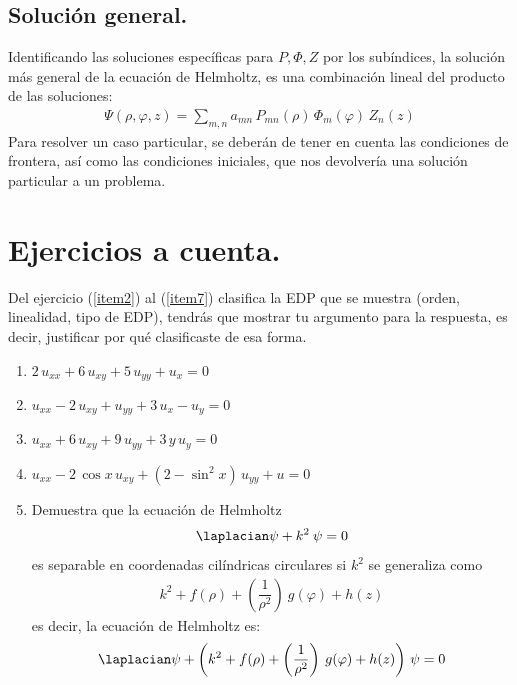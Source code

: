 \subsection{Solución general.}

Identificando las soluciones específicas para $P, \Phi, Z$ por los subíndices, la solución más general de la ecuación de Helmholtz, es una combinación lineal del producto de las soluciones:
\begin{align}
\Psi (\rho, \varphi, z) =  \sum_{m,n} a_{mn} \, P_{mn}(\rho) \, \Phi_{m}(\varphi) \, Z_{n}(z)
\label{eq:ecuacion_09_56}
\end{align}
Para resolver un caso particular, se deberán de tener en cuenta las condiciones de frontera, así como las condiciones iniciales, que nos devolvería una solución particular a un problema.
\section{Ejercicios a cuenta.}
Del ejercicio (\ref{item2}) al (\ref{item7}) clasifica la EDP que se muestra (orden, linealidad, tipo de EDP), tendrás que mostrar tu argumento para la respuesta, es decir, justificar por qué clasificaste de esa forma.
\begin{enumerate}
\item $2 \, u_{xx} + 6 \, u_{xy} + 5 \, u_{yy} + u_{x} = 0$ \label{item2}
\item $u_{xx} - 2 \, u_{xy} + u_{yy} + 3 \, u_{x} - u_{y} = 0$ \label{item3}
\item $u_{xx} + 6 \, u_{xy} + 9 \, u_{yy} + 3 \, y \, u_{y} = 0$ \label{item5}
\item $u_{xx} - 2 \, \cos x \, u_{xy} +  (2 - \sin^{2} x) \, u_{yy} + u = 0$ \label{item7}
\item Demuestra que la ecuación de Helmholtz
\begin{align*}
\laplacian \psi + k^{2} \: \psi = 0
\end{align*}
es separable en coordenadas cilíndricas circulares si $k^{2}$ se generaliza como
\begin{align*}
k^{2} + f(\rho) + \left( \dfrac{1}{\rho^{2}} \right) \: g(\varphi) + h(z)
\end{align*}
es decir, la ecuación de Helmholtz es:
\begin{align*}
\laplacian \psi + \left( k^{2} + f(\rho) + \left( \dfrac{1}{\rho^{2}} \right) \: g(\varphi) + h(z) \right) \, \psi = 0
\end{align*}
\end{enumerate}
